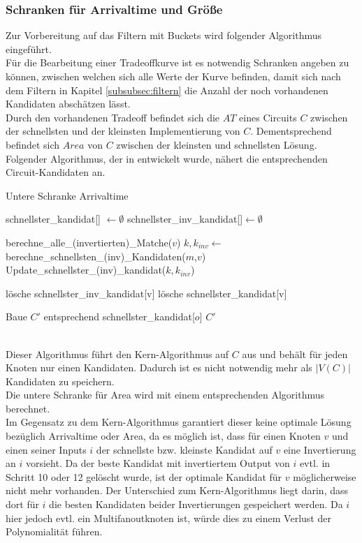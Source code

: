 \documentclass[11pt, a4paper, german]{article}
\begin{document}
\subsubsection{Schranken für Arrivaltime und Größe}
\label{subsubsec:schrankenalgo}
Zur Vorbereitung auf das Filtern mit Buckets wird folgender Algorithmus eingeführt.\\
Für die Bearbeitung einer Tradeoffkurve ist es notwendig Schranken angeben zu können, zwischen welchen sich alle Werte der Kurve befinden, damit sich nach dem Filtern in Kapitel \ref{subsubsec:filtern} die Anzahl der noch vorhandenen Kandidaten abschätzen lässt. \\
Durch den vorhandenen Tradeoff befindet sich die $AT$ eines Circuits $C$ zwischen der schnellsten und der kleinsten Implementierung von $C$. Dementsprechend befindet sich $Area$ von $C$ zwischen der kleinsten und schnellsten Lösung. Folgender Algorithmus, der in \cite{Elbert} entwickelt wurde, nähert die entsprechenden Circuit-Kandidaten an.\\

\begin{algorithm}[H]
 \LinesNumbered
 \DontPrintSemicolon
 \caption{Untere Schranke Arrivaltime}

 schnellster\_kandidat[] $\gets \emptyset$\;
 schnellster\_inv\_kandidat[]$ \gets \emptyset$\;
 {
   berechne\_alle\_(invertierten)\_Matche($v$)\;
   {
      $k,k_{inv} \gets $berechne\_schnellsten\_(inv)\_Kandidaten($m$,$v$)\;
      Update\_schnellster\_(inv)\_kandidat($k,k_{inv}$)\;
   }
   {
      
      {
	l\"osche schnellster\_inv\_kandidat[v]\;
      }
      \Else
      {
	l\"osche schnellster\_kandidat[v]\;
      }
   }
 }
 Baue $C'$ entsprechend schnellster\_kandidat[$o$]\;
 \Return $C'$\;
\end{algorithm}\ \\

Dieser Algorithmus führt den Kern-Algorithmus  auf $C$ aus und behält für jeden Knoten nur einen Kandidaten. Dadurch ist es nicht notwendig mehr als $|V(C)|$ Kandidaten zu speichern. \\
 Die untere Schranke für Area wird mit einem entsprechenden Algorithmus berechnet. \\
Im Gegensatz zu dem Kern-Algorithmus garantiert dieser keine optimale Lösung bezüglich Arrivaltime oder Area, da es möglich ist, dass für einen Knoten $v$ und einen seiner Inputs $i$ der schnellste bzw. kleinste Kandidat auf $v$ eine Invertierung an $i$ vorsieht. Da der beste Kandidat mit invertiertem Output von $i$ evtl. in Schritt 10  oder 12 gelöscht wurde, ist der optimale Kandidat für $v$ möglicherweise nicht mehr vorhanden. Der Unterschied zum Kern-Algorithmus liegt darin, dass dort für $i$ die besten Kandidaten beider Invertierungen gespeichert werden. Da $i$ hier jedoch evtl. ein Multifanoutknoten ist, würde dies zu einem Verlust der Polynomialität führen.\\
\end{document}
